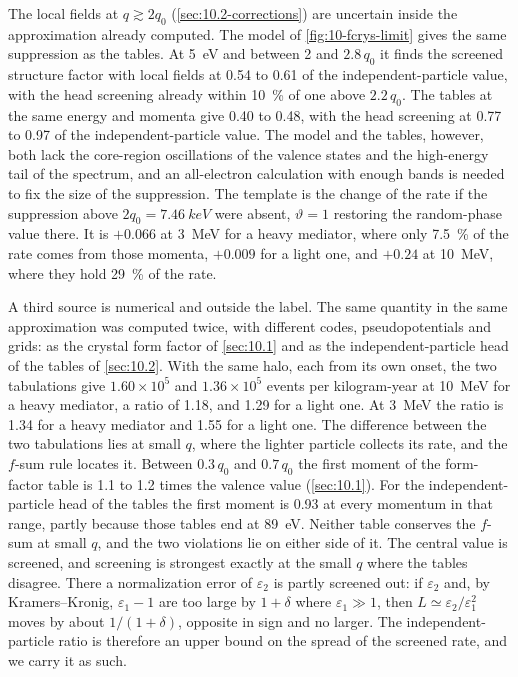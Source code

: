 The local fields at $q \gtrsim 2q_0$ (\cref{sec:10.2-corrections}) are uncertain inside the approximation already computed. The model of \cref{fig:10-fcrys-limit} gives the same suppression as the tables. At \SI{5}{eV} and between 2 and $2.8\,q_0$ it finds the screened structure factor with local fields at 0.54 to 0.61 of the independent-particle value, with the head screening already within \SI{10}{\percent} of one above $2.2\,q_0$. The tables at the same energy and momenta give 0.40 to 0.48, with the head screening at 0.77 to 0.97 of the independent-particle value. The model and the tables, however, both lack the core-region oscillations of the valence states and the high-energy tail of the spectrum, and an all-electron calculation with enough bands is needed to fix the size of the suppression. The template is the change of the rate if the suppression above $2q_0 = \SI{7.46}{keV}$ were absent, $\vartheta = 1$ restoring the random-phase value there. It is $+0.066$ at \SI{3}{MeV} for a heavy mediator, where only \SI{7.5}{\percent} of the rate comes from those momenta, $+0.009$ for a light one, and $+0.24$ at \SI{10}{MeV}, where they hold \SI{29}{\percent} of the rate.

A third source is numerical and outside the label. The same quantity in the same approximation was computed twice, with different codes, pseudopotentials and grids: as the crystal form factor of \cref{sec:10.1} and as the independent-particle head of the tables of \cref{sec:10.2}. With the same halo, each from its own onset, the two tabulations give $1.60\times10^5$ and $1.36\times10^5$ events per kilogram-year at \SI{10}{MeV} for a heavy mediator, a ratio of 1.18, and 1.29 for a light one. At \SI{3}{MeV} the ratio is 1.34 for a heavy mediator and 1.55 for a light one. The difference between the two tabulations lies at small $q$, where the lighter particle collects its rate, and the $f$-sum rule locates it. Between $0.3\,q_0$ and $0.7\,q_0$ the first moment of the form-factor table is 1.1 to 1.2 times the valence value (\cref{sec:10.1}). For the independent-particle head of the tables the first moment is 0.93 at every momentum in that range, partly because those tables end at \SI{89}{eV}. Neither table conserves the $f$-sum at small $q$, and the two violations lie on either side of it. The central value is screened, and screening is strongest exactly at the small $q$ where the tables disagree. There a normalization error of $\varepsilon_2$ is partly screened out: if $\varepsilon_2$ and, by Kramers--Kronig, $\varepsilon_1 - 1$ are too large by $1 + \delta$ where $\varepsilon_1 \gg 1$, then $L \simeq \varepsilon_2/\varepsilon_1^2$ moves by about $1/(1 + \delta)$, opposite in sign and no larger. The independent-particle ratio is therefore an upper bound on the spread of the screened rate, and we carry it as such.

